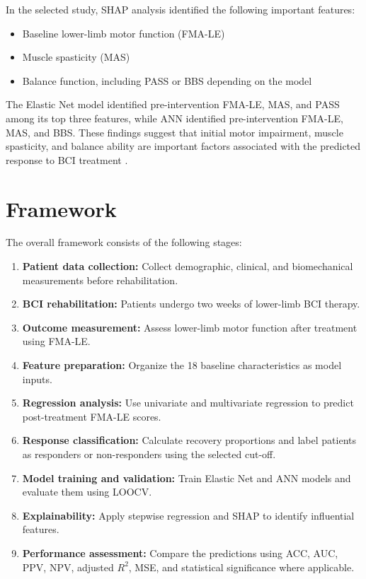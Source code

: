 In the selected study, SHAP analysis identified the following important features:

\begin{itemize}
    \item Baseline lower-limb motor function (FMA-LE)
    \item Muscle spasticity (MAS)
    \item Balance function, including PASS or BBS depending on the model
\end{itemize}

The Elastic Net model identified pre-intervention FMA-LE, MAS, and PASS among its top three features, while ANN identified pre-intervention FMA-LE, MAS, and BBS. These findings suggest that initial motor impairment, muscle spasticity, and balance ability are important factors associated with the predicted response to BCI treatment \cite{bib1}.


\section{{Framework}}


The overall framework consists of the following stages:

\begin{enumerate}
    \item \textbf{Patient data collection:} Collect demographic, clinical, and biomechanical measurements before rehabilitation.
    \item \textbf{BCI rehabilitation:} Patients undergo two weeks of lower-limb BCI therapy.
    \item \textbf{Outcome measurement:} Assess lower-limb motor function after treatment using FMA-LE.
    \item \textbf{Feature preparation:} Organize the 18 baseline characteristics as model inputs.
    \item \textbf{Regression analysis:} Use univariate and multivariate regression to predict post-treatment FMA-LE scores.
    \item \textbf{Response classification:} Calculate recovery proportions and label patients as responders or non-responders using the selected cut-off.
    \item \textbf{Model training and validation:} Train Elastic Net and ANN models and evaluate them using LOOCV.
    \item \textbf{Explainability:} Apply stepwise regression and SHAP to identify influential features.
    \item \textbf{Performance assessment:} Compare the predictions using ACC, AUC, PPV, NPV, adjusted $R^2$, MSE, and statistical significance where applicable.
\end{enumerate}

